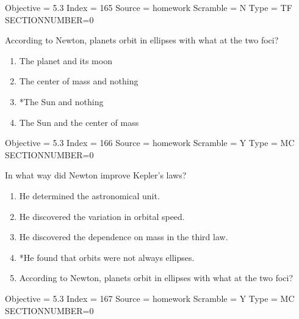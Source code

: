 \documentclass[11pt]{article}
\begin{document}
\begin{enumerate}
\begin{minipage}{\textwidth}
\begin{minipage}{\textwidth}
Objective = 5.3
Index = 165
Source = homework
Scramble = N
Type = TF
SECTIONNUMBER=0
\end{minipage}
\end{minipage}
\vskip 0.20in

\begin{minipage}{\textwidth}
\begin{minipage}{\textwidth}
\item According to Newton, planets orbit in ellipses with what at the two foci?
\begin{multicols}{2}
\begin{enumerate} 
\setlength{\itemsep}{1pt} 
\setlength{\parskip}{0pt} 
\setlength{\parsep}{0pt}
\setlength{\multicolsep}{1pt} 
\item The planet and its moon
\item The center of mass and nothing
\item *The Sun and nothing
\item The Sun and the center of mass
\end{enumerate} 
\vfill 
\end{multicols}

Objective = 5.3
Index = 166
Source = homework
Scramble = Y
Type = MC
SECTIONNUMBER=0
\end{minipage}
\end{minipage}
\vskip 0.20in

\begin{minipage}{\textwidth}
\begin{minipage}{\textwidth}
\item In what way did Newton improve Kepler's laws?
\begin{enumerate} 
\setlength{\itemsep}{1pt} 
\setlength{\parskip}{0pt} 
\setlength{\parsep}{0pt}
\setlength{\multicolsep}{1pt} 
\item He determined the astronomical unit.
\item He discovered the variation in orbital speed.
\item He discovered the dependence on mass in the third law.
\item *He found that orbits were not always ellipses.
\item According to Newton, planets orbit in ellipses with what at the two foci?
\end{enumerate} 
Objective = 5.3
Index = 167
Source = homework
Scramble = Y
Type = MC
SECTIONNUMBER=0
\end{minipage}
\end{minipage}
\vskip 0.20in


\end{enumerate}
\end{document}
